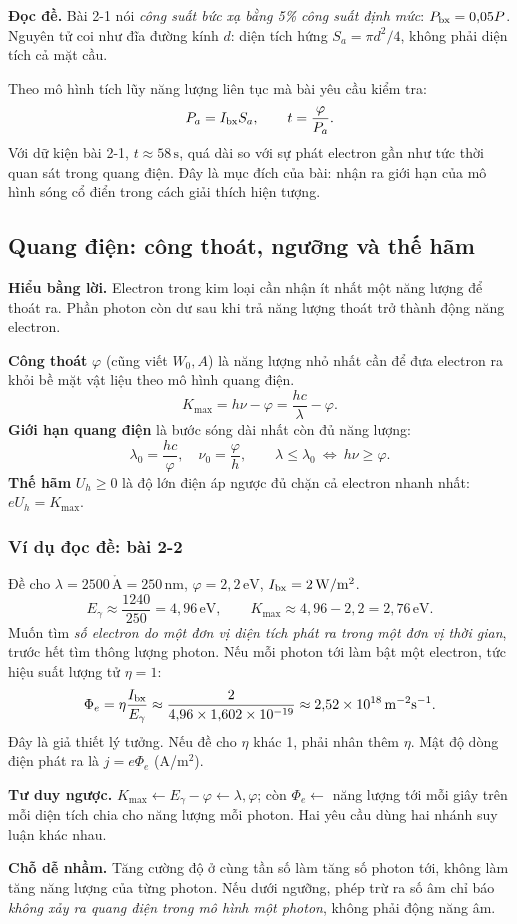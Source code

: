 \documentclass[11pt,a4paper]{article}
\newcommand{\unit}[1]{\,\mathrm{#1}}
\newcommand{\idea}[1]{\par\textbf{Hiểu bằng lời.} #1\par}
\newcommand{\readit}[1]{\par\textbf{Đọc đề.} #1\par}
\newcommand{\think}[1]{\par\textbf{Tư duy ngược.} #1\par}
\newcommand{\trap}[1]{\par\textbf{Chỗ dễ nhầm.} #1\par}
\newcommand{\ex}[1]{\subsubsection*{Ví dụ đọc đề: #1}}
\begin{document}
\readit{Bài 2-1 nói \emph{công suất bức xạ bằng 5\% công suất định mức}:
$P_{\rm bx}=0{,}05P$. Nguyên tử coi như đĩa đường kính $d$:
diện tích hứng $S_a=\pi d^2/4$, không phải diện tích cả mặt cầu.}
Theo mô hình tích lũy năng lượng liên tục mà bài yêu cầu kiểm tra:
\[
P_a=I_{\rm bx}S_a,\qquad t=\frac{\varphi}{P_a}.
\]
Với dữ kiện bài 2-1, $t\approx58\unit s$, quá dài so với sự phát electron
gần như tức thời quan sát trong quang điện. Đây là mục đích của bài:
nhận ra giới hạn của mô hình sóng cổ điển trong cách giải thích hiện tượng.

\subsection{Quang điện: công thoát, ngưỡng và thế hãm}\label{sec:photoelectric}
\idea{Electron trong kim loại cần nhận ít nhất một năng lượng để thoát ra.
Phần photon còn dư sau khi trả năng lượng thoát trở thành động năng electron.}
\textbf{Công thoát} $\varphi$ (cũng viết $W_0,A$) là năng lượng nhỏ nhất cần
để đưa electron ra khỏi bề mặt vật liệu theo mô hình quang điện.
\[
K_{\max}=h\nu-\varphi=\frac{hc}{\lambda}-\varphi.
\]
\textbf{Giới hạn quang điện} là bước sóng dài nhất còn đủ năng lượng:
\[
\lambda_0=\frac{hc}{\varphi},\quad \nu_0=\frac\varphi h,
\qquad \lambda\le\lambda_0\ \Leftrightarrow\ h\nu\ge\varphi.
\]
\textbf{Thế hãm} $U_h\ge0$ là độ lớn điện áp ngược đủ chặn cả electron
nhanh nhất: $eU_h=K_{\max}$.

\ex{bài 2-2}
Đề cho $\lambda=2500\unit{\mathring A}=250\unit{nm}$,
$\varphi=2{,}2\unit{eV}$, $I_{\rm bx}=2\unit{W/m^2}$.
\[
E_\gamma\approx\frac{1240}{250}=4{,}96\unit{eV},\qquad
K_{\max}\approx4{,}96-2{,}2=2{,}76\unit{eV}.
\]
Muốn tìm \emph{số electron do một đơn vị diện tích phát ra trong một đơn vị
thời gian}, trước hết tìm thông lượng photon. Nếu mỗi photon tới làm bật
một electron, tức hiệu suất lượng tử $\eta=1$:
\[
\Phi_e=\eta\frac{I_{\rm bx}}{E_\gamma}
\approx\frac2{4{,}96\times1{,}602\times10^{-19}}
\approx2{,}52\times10^{18}\unit{m^{-2}s^{-1}}.
\]
Đây là giả thiết lý tưởng. Nếu đề cho $\eta$ khác 1, phải nhân thêm $\eta$.
Mật độ dòng điện phát ra là $j=e\Phi_e$ (A/m$^2$).

\think{$K_{\max}\leftarrow E_\gamma-\varphi\leftarrow\lambda,\varphi$;
còn $\Phi_e\leftarrow$ năng lượng tới mỗi giây trên mỗi diện tích chia cho
năng lượng mỗi photon. Hai yêu cầu dùng hai nhánh suy luận khác nhau.}

\trap{Tăng cường độ ở cùng tần số làm tăng số photon tới, không làm tăng
năng lượng của từng photon. Nếu dưới ngưỡng, phép trừ ra số âm chỉ báo
\emph{không xảy ra quang điện trong mô hình một photon}, không phải động năng âm.}
\end{document}

